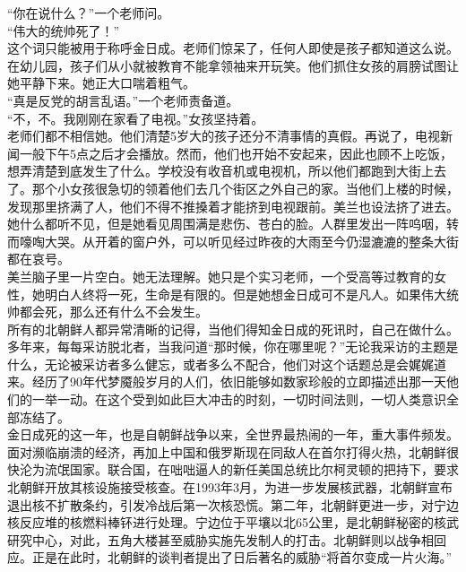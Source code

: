 “你在说什么？”一个老师问。\\

“伟大的统帅死了！”\\

这个词只能被用于称呼金日成。老师们惊呆了，任何人即使是孩子都知道这么说。在幼儿园，孩子们从小就被教育不能拿领袖来开玩笑。他们抓住女孩的肩膀试图让她平静下来。她正大口喘着粗气。\\

“真是反党的胡言乱语。”一个老师责备道。\\

“不，不。我刚刚在家看了电视。”女孩坚持着。\\

老师们都不相信她。他们清楚5岁大的孩子还分不清事情的真假。再说了，电视新闻一般下午5点之后才会播放。然而，他们也开始不安起来，因此也顾不上吃饭，想弄清楚到底发生了什么。学校没有收音机或电视机，所以他们都跑到大街上去了。那个小女孩很急切的领着他们去几个街区之外自己的家。当他们上楼的时候，发现那里挤满了人，他们不得不推搡着才能挤到电视跟前。美兰也设法挤了进去。她什么都听不见，但是她看见周围满是悲伤、苍白的脸。人群里发出一阵呜咽，转而嚎啕大哭。从开着的窗户外，可以听见经过昨夜的大雨至今仍湿漉漉的整条大街都在哀号。\\

美兰脑子里一片空白。她无法理解。她只是个实习老师，一个受高等过教育的女性，她明白人终将一死，生命是有限的。但是她想金日成可不是凡人。如果伟大统帅都会死，那么还有什么不会发生。\\

所有的北朝鲜人都异常清晰的记得，当他们得知金日成的死讯时，自己在做什么。多年来，每每采访脱北者，当我问道“那时候，你在哪里呢？”无论我采访的主题是什么，无论被采访者多么健忘，或者多么不配合，他们对这个话题总是会娓娓道来。经历了90年代梦魇般岁月的人们，依旧能够如数家珍般的立即描述出那一天他们的一举一动。在这个受到如此巨大冲击的时刻，一切时间法则，一切人类意识全部冻结了。\\

金日成死的这一年，也是自朝鲜战争以来，全世界最热闹的一年，重大事件频发。面对濒临崩溃的经济，再加上中国和俄罗斯现在同敌人在首尔打得火热，北朝鲜很快沦为流氓国家。联合国，在咄咄逼人的新任美国总统比尔柯灵顿的把持下，要求北朝鲜开放其核设施接受核查。在1993年3月，为进一步发展核武器，北朝鲜宣布退出核不扩散条约，引发冷战后第一次核恐慌。第二年，北朝鲜更进一步，对宁边核反应堆的核燃料棒钚进行处理。宁边位于平壤以北65公里，是北朝鲜秘密的核武研究中心，对此，五角大楼甚至威胁实施先发制人的打击。北朝鲜则以战争相回应。正是在此时，北朝鲜的谈判者提出了日后著名的威胁“将首尔变成一片火海。”\\

